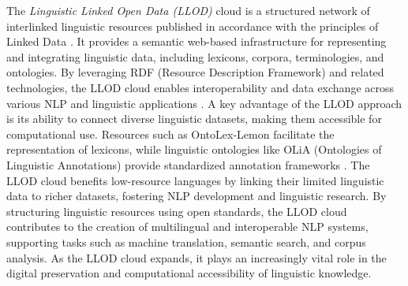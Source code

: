 \documentclass{article}
\begin{document}
The \emph{Linguistic Linked Open Data (LLOD)} cloud is a structured network of interlinked linguistic resources published in accordance with the principles of Linked Data \cite{bizer2009linked}. It provides a semantic web-based infrastructure for representing and integrating linguistic data, including lexicons, corpora, terminologies, and ontologies. By leveraging RDF (Resource Description Framework) and related technologies, the LLOD cloud enables interoperability and data exchange across various NLP and linguistic applications \cite{chiarcos2013linguistic}.  A key advantage of the LLOD approach is its ability to connect diverse linguistic datasets, making them accessible for computational use. Resources such as OntoLex-Lemon facilitate the representation of lexicons, while linguistic ontologies like OLiA (Ontologies of Linguistic Annotations) provide standardized annotation frameworks \cite{chiarcos2012olia}. The LLOD cloud benefits low-resource languages by linking their limited linguistic data to richer datasets, fostering NLP development and linguistic research. By structuring linguistic resources using open standards, the LLOD cloud contributes to the creation of multilingual and interoperable NLP systems, supporting tasks such as machine translation, semantic search, and corpus analysis. As the LLOD cloud expands, it plays an increasingly vital role in the digital preservation and computational accessibility of linguistic knowledge.  




\end{document}
